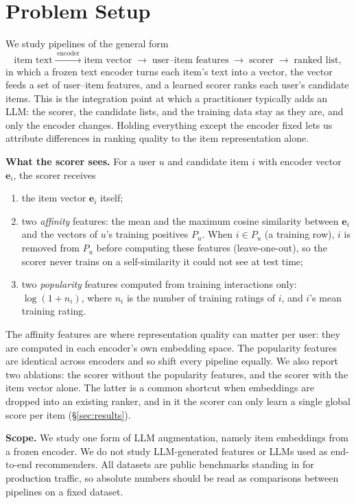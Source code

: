 \section{Problem Setup}
\label{sec:problem-setup}

We study pipelines of the general form
\[
\text{item text} \xrightarrow{\;\text{encoder}\;} \text{item vector}
\;\rightarrow\; \text{user--item features} \;\rightarrow\; \text{scorer}
\;\rightarrow\; \text{ranked list},
\]
in which a frozen text encoder turns each item's text into a vector, the
vector feeds a set of user--item features, and a learned scorer ranks
each user's candidate items. This is the integration point at which a
practitioner typically adds an LLM: the scorer, the candidate lists, and
the training data stay as they are, and only the encoder changes. Holding
everything except the encoder fixed lets us attribute differences in
ranking quality to the item representation alone.

\textbf{What the scorer sees.} For a user $u$ and candidate item $i$ with
encoder vector $\mathbf{e}_i$, the scorer receives
\begin{enumerate}
  \item the item vector $\mathbf{e}_i$ itself;
  \item two \emph{affinity} features: the mean and the maximum cosine
    similarity between $\mathbf{e}_i$ and the vectors of $u$'s training
    positives $P_u$. When $i \in P_u$ (a training row), $i$ is removed
    from $P_u$ before computing these features (leave-one-out), so the
    scorer never trains on a self-similarity it could not see at test
    time;
  \item two \emph{popularity} features computed from training
    interactions only: $\log(1+n_i)$, where $n_i$ is the number of
    training ratings of $i$, and $i$'s mean training rating.
\end{enumerate}
The affinity features are where representation quality can matter per
user: they are computed in each encoder's own embedding space. The
popularity features are identical across encoders and so shift every
pipeline equally. We also report two ablations: the scorer without the
popularity features, and the scorer with the item vector alone. The
latter is a common shortcut when embeddings are dropped into an
existing ranker, and in it the scorer can only learn a single global
score per item
(\S\ref{sec:results}).

\textbf{Scope.} We study one form of LLM augmentation, namely item
embeddings from a frozen encoder. We do not study LLM-generated features
or LLMs used as end-to-end recommenders. All datasets are public
benchmarks standing in for production traffic, so absolute numbers
should be read as comparisons between pipelines on a fixed dataset.
